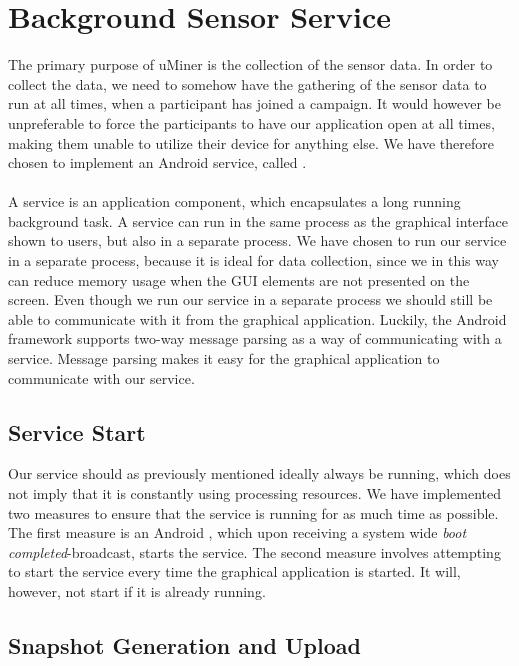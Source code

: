 
\section{Background Sensor Service}
\label{sec:background_sensor_service}

The primary purpose of uMiner is the collection of the sensor data. In order to collect the data, we need to somehow have the gathering of the sensor data to run at all times, when a participant has joined a campaign. It would however be unpreferable to force the participants to have our application open at all times, making them unable to utilize their device for anything else. We have therefore chosen to implement an Android service, called . 
\\\\
A service is an application component, which encapsulates a long running background task. A service can run in the same process as the graphical interface shown to users, but also in a separate process. We have chosen to run our service in a separate process, because it is ideal for data collection, since we in this way can reduce memory usage when the GUI elements are not presented on the screen. Even though we run our service in a separate process we should still be able to communicate with it from the graphical application. Luckily, the Android framework supports two-way message parsing as a way of communicating with a service. Message parsing makes it easy for the graphical application to communicate with our service.

\subsection{Service Start}
\label{sub:service_start}
Our service should as previously mentioned ideally always be running, which does not imply that it is constantly using processing resources. We have implemented two measures to ensure that the service is running for as much time as possible. The first measure is an Android , which upon receiving a system wide \emph{boot completed}-broadcast, starts the service. The second measure involves attempting to start the service every time the graphical application is started. It will, however, not start if it is already running.

\subsection{Snapshot Generation and Upload}
\label{sub:background_sensor_service_snapshot_generation_and_upload}

